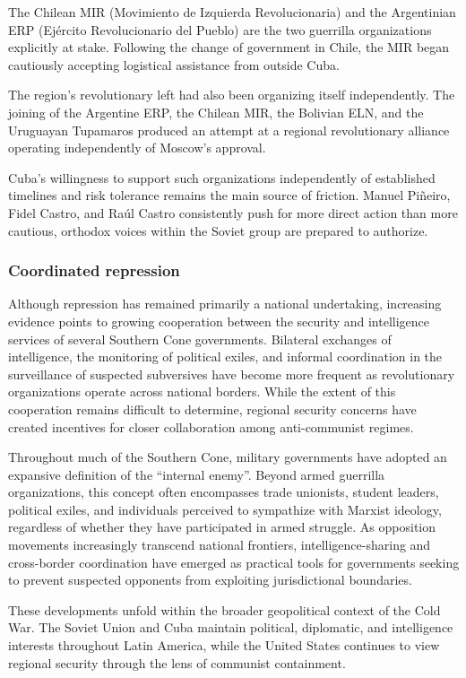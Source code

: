 The Chilean MIR (Movimiento de Izquierda Revolucionaria) and the Argentinian ERP (Ejército Revolucionario del Pueblo) are the two guerrilla organizations explicitly at stake. Following the change of government in Chile, the MIR began cautiously accepting logistical assistance from outside Cuba.

The region's revolutionary left had also been organizing itself independently. The joining of the Argentine ERP, the Chilean MIR, the Bolivian ELN, and the Uruguayan Tupamaros produced an attempt at a regional revolutionary alliance operating independently of Moscow's approval.

Cuba's willingness to support such organizations independently of established timelines and risk tolerance remains the main source of friction. Manuel Piñeiro, Fidel Castro, and Raúl Castro consistently push for more direct action than more cautious, orthodox voices within the Soviet group are prepared to authorize.

\subsubsection{Coordinated repression}

Although repression has remained primarily a national undertaking, increasing evidence points to growing cooperation between the security and intelligence services of several Southern Cone governments. Bilateral exchanges of intelligence, the monitoring of political exiles, and informal coordination in the surveillance of suspected subversives have become more frequent as revolutionary organizations operate across national borders. While the extent of this cooperation remains difficult to determine, regional security concerns have created incentives for closer collaboration among anti-communist regimes.

Throughout much of the Southern Cone, military governments have adopted an expansive definition of the “internal enemy”. Beyond armed guerrilla organizations, this concept often encompasses trade unionists, student leaders, political exiles, and individuals perceived to sympathize with Marxist ideology, regardless of whether they have participated in armed struggle. As opposition movements increasingly transcend national frontiers, intelligence-sharing and cross-border coordination have emerged as practical tools for governments seeking to prevent suspected opponents from exploiting jurisdictional boundaries.

These developments unfold within the broader geopolitical context of the Cold War. The Soviet Union and Cuba maintain political, diplomatic, and intelligence interests throughout Latin America, while the United States continues to view regional security through the lens of communist containment.

